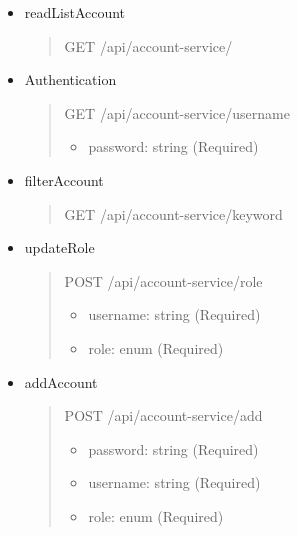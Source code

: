 \begin{itemize}
	\item readListAccount
	\begin{quote}
		GET /api/account-service/
	\end{quote}

	\item Authentication
	\begin{quote}
		GET /api/account-service/{username}
		\begin{itemize}
			\item password: string (Required)
			\end{itemize}
	\end{quote}

	\item filterAccount
	\begin{quote}
		GET /api/account-service/{keyword}
	\end{quote}

	\item updateRole
	\begin{quote}
		POST /api/account-service/role
		\begin{itemize}
			\item username: string (Required)
			\item role: enum (Required)
		\end{itemize}
	\end{quote}

	\item addAccount
	\begin{quote}
		POST /api/account-service/add
		\begin{itemize}
			\item password: string (Required)
			\item username: string (Required)
			\item role: enum (Required)
		\end{itemize}
	\end{quote}
\end{itemize}

